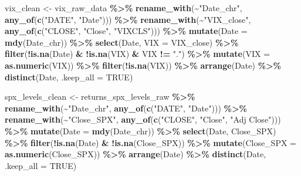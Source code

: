 \documentclass[
]{article}
\newenvironment{Shaded}{\begin{snugshade}}{\end{snugshade}}
\newcommand{\AttributeTok}[1]{\textcolor[rgb]{0.13,0.29,0.53}{#1}}
\newcommand{\ConstantTok}[1]{\textcolor[rgb]{0.56,0.35,0.01}{#1}}
\newcommand{\FunctionTok}[1]{\textcolor[rgb]{0.13,0.29,0.53}{\textbf{#1}}}
\newcommand{\NormalTok}[1]{#1}
\newcommand{\OtherTok}[1]{\textcolor[rgb]{0.56,0.35,0.01}{#1}}
\newcommand{\SpecialCharTok}[1]{\textcolor[rgb]{0.81,0.36,0.00}{\textbf{#1}}}
\newcommand{\StringTok}[1]{\textcolor[rgb]{0.31,0.60,0.02}{#1}}
\begin{document}
\begin{Shaded}
\begin{Highlighting}[]
\NormalTok{  vix\_clean }\OtherTok{\textless{}{-}}\NormalTok{ vix\_raw\_data }\SpecialCharTok{\%\textgreater{}\%}
    \FunctionTok{rename\_with}\NormalTok{(}\SpecialCharTok{\textasciitilde{}}\StringTok{"Date\_chr"}\NormalTok{, }\FunctionTok{any\_of}\NormalTok{(}\FunctionTok{c}\NormalTok{(}\StringTok{"DATE"}\NormalTok{, }\StringTok{"Date"}\NormalTok{))) }\SpecialCharTok{\%\textgreater{}\%}
    \FunctionTok{rename\_with}\NormalTok{(}\SpecialCharTok{\textasciitilde{}}\StringTok{"VIX\_close"}\NormalTok{, }\FunctionTok{any\_of}\NormalTok{(}\FunctionTok{c}\NormalTok{(}\StringTok{"CLOSE"}\NormalTok{, }\StringTok{"Close"}\NormalTok{, }\StringTok{"VIXCLS"}\NormalTok{))) }\SpecialCharTok{\%\textgreater{}\%}
    \FunctionTok{mutate}\NormalTok{(}\AttributeTok{Date =} \FunctionTok{mdy}\NormalTok{(Date\_chr)) }\SpecialCharTok{\%\textgreater{}\%}
    \FunctionTok{select}\NormalTok{(Date, }\AttributeTok{VIX =}\NormalTok{ VIX\_close) }\SpecialCharTok{\%\textgreater{}\%}
    \FunctionTok{filter}\NormalTok{(}\SpecialCharTok{!}\FunctionTok{is.na}\NormalTok{(Date) }\SpecialCharTok{\&} \SpecialCharTok{!}\FunctionTok{is.na}\NormalTok{(VIX) }\SpecialCharTok{\&}\NormalTok{ VIX }\SpecialCharTok{!=} \StringTok{"."}\NormalTok{) }\SpecialCharTok{\%\textgreater{}\%}
    \FunctionTok{mutate}\NormalTok{(}\AttributeTok{VIX =} \FunctionTok{as.numeric}\NormalTok{(VIX)) }\SpecialCharTok{\%\textgreater{}\%}
    \FunctionTok{filter}\NormalTok{(}\SpecialCharTok{!}\FunctionTok{is.na}\NormalTok{(VIX)) }\SpecialCharTok{\%\textgreater{}\%}
    \FunctionTok{arrange}\NormalTok{(Date) }\SpecialCharTok{\%\textgreater{}\%}
    \FunctionTok{distinct}\NormalTok{(Date, }\AttributeTok{.keep\_all =} \ConstantTok{TRUE}\NormalTok{)}
  
\NormalTok{  spx\_levels\_clean }\OtherTok{\textless{}{-}}\NormalTok{ returns\_spx\_levels\_raw }\SpecialCharTok{\%\textgreater{}\%}
    \FunctionTok{rename\_with}\NormalTok{(}\SpecialCharTok{\textasciitilde{}}\StringTok{"Date\_chr"}\NormalTok{, }\FunctionTok{any\_of}\NormalTok{(}\FunctionTok{c}\NormalTok{(}\StringTok{"DATE"}\NormalTok{, }\StringTok{"Date"}\NormalTok{))) }\SpecialCharTok{\%\textgreater{}\%}
    \FunctionTok{rename\_with}\NormalTok{(}\SpecialCharTok{\textasciitilde{}}\StringTok{"Close\_SPX"}\NormalTok{, }\FunctionTok{any\_of}\NormalTok{(}\FunctionTok{c}\NormalTok{(}\StringTok{"CLOSE"}\NormalTok{, }\StringTok{"Close"}\NormalTok{, }\StringTok{"Adj Close"}\NormalTok{))) }\SpecialCharTok{\%\textgreater{}\%}
    \FunctionTok{mutate}\NormalTok{(}\AttributeTok{Date =} \FunctionTok{mdy}\NormalTok{(Date\_chr)) }\SpecialCharTok{\%\textgreater{}\%}
    \FunctionTok{select}\NormalTok{(Date, Close\_SPX) }\SpecialCharTok{\%\textgreater{}\%}
    \FunctionTok{filter}\NormalTok{(}\SpecialCharTok{!}\FunctionTok{is.na}\NormalTok{(Date) }\SpecialCharTok{\&} \SpecialCharTok{!}\FunctionTok{is.na}\NormalTok{(Close\_SPX)) }\SpecialCharTok{\%\textgreater{}\%}
    \FunctionTok{mutate}\NormalTok{(}\AttributeTok{Close\_SPX =} \FunctionTok{as.numeric}\NormalTok{(Close\_SPX)) }\SpecialCharTok{\%\textgreater{}\%}
    \FunctionTok{arrange}\NormalTok{(Date) }\SpecialCharTok{\%\textgreater{}\%}
    \FunctionTok{distinct}\NormalTok{(Date, }\AttributeTok{.keep\_all =} \ConstantTok{TRUE}\NormalTok{)}
  

\end{Highlighting}
\end{Shaded}
\end{document}
